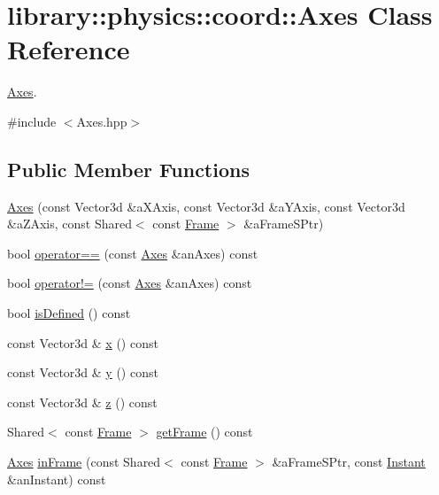 \hypertarget{classlibrary_1_1physics_1_1coord_1_1_axes}{}\section{library\+:\+:physics\+:\+:coord\+:\+:Axes Class Reference}
\label{classlibrary_1_1physics_1_1coord_1_1_axes}


\hyperlink{classlibrary_1_1physics_1_1coord_1_1_axes}{Axes}.  




{\ttfamily \#include $<$Axes.\+hpp$>$}

\subsection*{Public Member Functions}
\begin{DoxyCompactItemize}
\item 
\hyperlink{classlibrary_1_1physics_1_1coord_1_1_axes_a1af682b7f36ff1d594e6d93c56f7bf1d}{Axes} (const Vector3d \&a\+X\+Axis, const Vector3d \&a\+Y\+Axis, const Vector3d \&a\+Z\+Axis, const Shared$<$ const \hyperlink{classlibrary_1_1physics_1_1coord_1_1_frame}{Frame} $>$ \&a\+Frame\+S\+Ptr)
\item 
bool \hyperlink{classlibrary_1_1physics_1_1coord_1_1_axes_ace61547b524226237b377644201f62dd}{operator==} (const \hyperlink{classlibrary_1_1physics_1_1coord_1_1_axes}{Axes} \&an\+Axes) const
\item 
bool \hyperlink{classlibrary_1_1physics_1_1coord_1_1_axes_a7732a78df5a460db8a73deb1d736bcc0}{operator!=} (const \hyperlink{classlibrary_1_1physics_1_1coord_1_1_axes}{Axes} \&an\+Axes) const
\item 
bool \hyperlink{classlibrary_1_1physics_1_1coord_1_1_axes_a5f03439d03d6f22449bdea28e22bb074}{is\+Defined} () const
\item 
const Vector3d \& \hyperlink{classlibrary_1_1physics_1_1coord_1_1_axes_acb94f5b4bc9e6cf628635987cfb9c990}{x} () const
\item 
const Vector3d \& \hyperlink{classlibrary_1_1physics_1_1coord_1_1_axes_ae777cb405641d9f71d07ec706787b217}{y} () const
\item 
const Vector3d \& \hyperlink{classlibrary_1_1physics_1_1coord_1_1_axes_a22fa1ae49680fc2c4e8e7e905e472301}{z} () const
\item 
Shared$<$ const \hyperlink{classlibrary_1_1physics_1_1coord_1_1_frame}{Frame} $>$ \hyperlink{classlibrary_1_1physics_1_1coord_1_1_axes_a117493dc268795fd00a785c9cc373259}{get\+Frame} () const
\item 
\hyperlink{classlibrary_1_1physics_1_1coord_1_1_axes}{Axes} \hyperlink{classlibrary_1_1physics_1_1coord_1_1_axes_af2d10c4af1b5b8165f1d75bdd5c3d882}{in\+Frame} (const Shared$<$ const \hyperlink{classlibrary_1_1physics_1_1coord_1_1_frame}{Frame} $>$ \&a\+Frame\+S\+Ptr, const \hyperlink{classlibrary_1_1physics_1_1time_1_1_instant}{Instant} \&an\+Instant) const
\end{DoxyCompactItemize}
